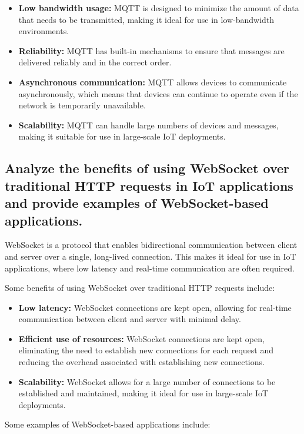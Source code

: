 \documentclass[12pt, a4paper, oneside]{article}
\begin{document}
\begin{itemize}
	\item \textbf{Low bandwidth usage:} MQTT is designed to minimize the amount of data that needs to be transmitted, making it ideal for use in low-bandwidth environments.
	\item \textbf{Reliability:} MQTT has built-in mechanisms to ensure that messages are delivered reliably and in the correct order.
	\item \textbf{Asynchronous communication:} MQTT allows devices to communicate asynchronously, which means that devices can continue to operate even if the network is temporarily unavailable.
	\item \textbf{Scalability:} MQTT can handle large numbers of devices and messages, making it suitable for use in large-scale IoT deployments.
\end{itemize}

\subsection{Analyze the benefits of using WebSocket over traditional HTTP requests in IoT applications and provide examples of WebSocket-based applications.}

WebSocket is a protocol that enables bidirectional communication between client and server over a single, long-lived connection. This makes it ideal for use in IoT applications, where low latency and real-time communication are often required.

Some benefits of using WebSocket over traditional HTTP requests include:

\begin{itemize}
	\item \textbf{Low latency:} WebSocket connections are kept open, allowing for real-time communication between client and server with minimal delay.
	\item \textbf{Efficient use of resources:} WebSocket connections are kept open, eliminating the need to establish new connections for each request and reducing the overhead associated with establishing new connections.
	\item \textbf{Scalability:} WebSocket allows for a large number of connections to be established and maintained, making it ideal for use in large-scale IoT deployments.
\end{itemize}

Some examples of WebSocket-based applications include:
\end{document}
